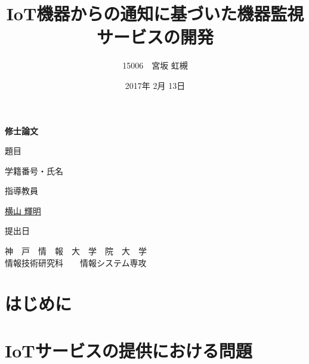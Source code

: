 \documentclass[a4paper]{jreport}
\begin{document}
\makeatletter
\renewcommand{\bibname}{参考文献}

\title{IoT機器からの通知に基づいた機器監視サービスの開発}
\author{15006　宮坂 虹槻}
\date{2017年 2月 13日}
\def\@teacher{横山 輝明}

\begin{titlepage}\begin{center}
{\Huge \textbf{修士論文} \par}
\vspace{1.5cm}
{\LARGE\gt 題目 \par}
{\LARGE\gt \underline{\@title} \par}
\vspace{2.5cm}
{\LARGE\gt 学籍番号・氏名 \par}
\vspace{1.5cm}
{\LARGE \underline{\@author} \par}
\vspace{1.5cm}
{\LARGE\gt 指導教員 \par}
\vspace{1.5cm}
{\LARGE\gt \underline{\@teacher} \par}
\vspace{1.5cm}
{\LARGE\gt 提出日 \par}
\vspace{1.5cm}
{\LARGE\gt \underline{\@date} \par}
\vspace{1.5cm}
{\Large\gt
神　戸　情　報　大　学　院　大　学\\
情報技術研究科　　情報システム専攻\\
\par}
\end{center}\end{titlepage}
\restoregeometry
\makeatother

\tableofcontents
\listoffigures
\listoftables

\begin{abstract}

\end{abstract}

\chapter{はじめに}

\chapter{IoTサービスの提供における問題}

\end{document}
